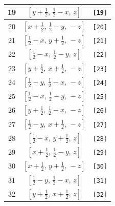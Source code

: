 \documentclass[fleqn,8pt]{jsarticle}
\begin{document}
\begin{longtable}{ccc}
19 & $\left[ y + \frac{1}{2},\, \frac{1}{2} - x,\, z \right]$ & {\tt [19]} \\ \hline
20 & $\left[ x + \frac{1}{2},\, \frac{1}{2} - y,\, - z \right]$ & {\tt [20]} \\ \hline
21 & $\left[ \frac{1}{2} - x,\, y + \frac{1}{2},\, - z \right]$ & {\tt [21]} \\ \hline
22 & $\left[ \frac{1}{2} - x,\, \frac{1}{2} - y,\, z \right]$ & {\tt [22]} \\ \hline
23 & $\left[ y + \frac{1}{2},\, x + \frac{1}{2},\, - z \right]$ & {\tt [23]} \\ \hline
24 & $\left[ \frac{1}{2} - y,\, \frac{1}{2} - x,\, - z \right]$ & {\tt [24]} \\ \hline
25 & $\left[ \frac{1}{2} - x,\, \frac{1}{2} - y,\, - z \right]$ & {\tt [25]} \\ \hline
26 & $\left[ y + \frac{1}{2},\, \frac{1}{2} - x,\, - z \right]$ & {\tt [26]} \\ \hline
27 & $\left[ \frac{1}{2} - y,\, x + \frac{1}{2},\, - z \right]$ & {\tt [27]} \\ \hline
28 & $\left[ \frac{1}{2} - x,\, y + \frac{1}{2},\, z \right]$ & {\tt [28]} \\ \hline
29 & $\left[ x + \frac{1}{2},\, \frac{1}{2} - y,\, z \right]$ & {\tt [29]} \\ \hline
30 & $\left[ x + \frac{1}{2},\, y + \frac{1}{2},\, - z \right]$ & {\tt [30]} \\ \hline
31 & $\left[ \frac{1}{2} - y,\, \frac{1}{2} - x,\, z \right]$ & {\tt [31]} \\ \hline
32 & $\left[ y + \frac{1}{2},\, x + \frac{1}{2},\, z \right]$ & {\tt [32]} \\
\end{longtable}
\end{document}
